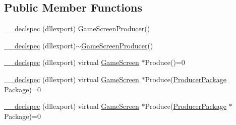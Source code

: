 \subsection*{Public Member Functions}
\begin{DoxyCompactItemize}
\item 
\hyperlink{class_game_screen_producer_a763fe68a79dccbe05e843124ad62eb36}{\-\_\-\-\_\-declspec} (dllexport) \hyperlink{class_game_screen_producer}{Game\-Screen\-Producer}()
\item 
\hyperlink{class_game_screen_producer_a3b4fd8a10b2a9e9ed2b5816d464cb3bb}{\-\_\-\-\_\-declspec} (dllexport)$\sim$\hyperlink{class_game_screen_producer}{Game\-Screen\-Producer}()
\item 
\hyperlink{class_game_screen_producer_a56e7ccd432601c6a28f714201dabc46f}{\-\_\-\-\_\-declspec} (dllexport) virtual \hyperlink{class_game_screen}{Game\-Screen} $\ast$Produce()=0
\item 
\hyperlink{class_game_screen_producer_a7a18ea24631d12709cdf30f692802ba2}{\-\_\-\-\_\-declspec} (dllexport) virtual \hyperlink{class_game_screen}{Game\-Screen} $\ast$Produce(\hyperlink{class_producer_package}{Producer\-Package} Package)=0
\item 
\hyperlink{class_game_screen_producer_a86b3d35e0edf3bdc411bb9cb79ea2647}{\-\_\-\-\_\-declspec} (dllexport) virtual \hyperlink{class_game_screen}{Game\-Screen} $\ast$Produce(\hyperlink{class_producer_package}{Producer\-Package} $\ast$Package)=0
\end{DoxyCompactItemize}


